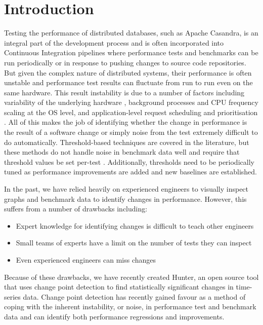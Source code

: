 \documentclass[sigconf]{acmart}
\begin{document}
\section{Introduction}
Testing the performance of distributed databases, such as Apache Casandra, is an integral part of
the development process and is often incorporated into Continuous Integration pipelines where
performance tests and benchmarks can be run periodically or in response to pushing changes to source
code repositories. But given the complex nature of distributed systems, their performance is often
unstable and performance test results can fluctuate from run to run even on the same hardware. This
result instability is due to a number of factors including variability of the underlying hardware
\cite{ONLYCONSTANTISCHANGE}, background processes and CPU frequency scaling at the OS level, and
application-level request scheduling and prioritisation \cite{TALESOFTHETAIL}. All of this makes the
job of identifying whether the change in performance is the result of a software change or simply
noise from the test extremely difficult to do automatically. Threshold-based techniques are covered
in the literature, but these methods do not handle noise in benchmark data well and require that
threshold values be set per-test \cite{MONGOCPD}. Additionally, thresholds need to be periodically 
tuned as performance improvements are added and new baselines are established.

In the past, we have relied heavily on experienced engineers to visually inspect graphs and benchmark
data to identify changes in performance. However, this suffers from a number of drawbacks including:

\begin{itemize}
\item Expert knowledge for identifying changes is difficult to teach other engineers
\item Small teams of experts have a limit on the number of tests they can inspect
\item Even experienced engineers can miss changes
\end{itemize}

Because of these drawbacks, we have recently created Hunter\cite{HUNTER}, an open source tool that uses change point detection to find statistically significant changes in time-series data. Change point detection has recently gained favour as a method of coping with the inherent instability, or noise, in performance test and benchmark data \cite{MONGOCPD} and can identify both performance regressions and improvements.
\end{document}
